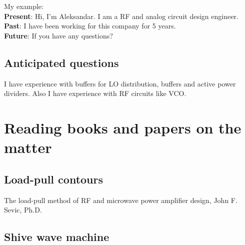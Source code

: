 \documentclass{article}
\begin{document}
My example:\\
\textbf{Present}: Hi, I’m Aleksandar. I am a RF and analog circuit design engineer. \\
\textbf{Past}: I have been working for this company for 5 years.\\
\textbf{Future}: If you have any questions?

\subsection{Anticipated questions}

\begin{question}
	I have experience with buffers for LO distribution, buffers and active power dividers. 
	Also I have experience with RF circuits like VCO.
\end{question}


\section{Reading books and papers on the matter}


\subsection{Load-pull contours}

The load-pull method of RF and microwave power amplifier design, John F. Sevic, Ph.D.


% 

%


\subsection{Shive wave machine}
\end{document}
